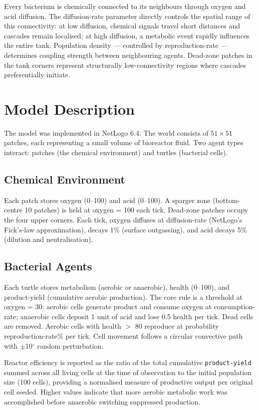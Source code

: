\documentclass[12pt]{article}
\begin{document}
Every bacterium is chemically connected to its neighbours through oxygen and acid diffusion. The diffusion-rate parameter directly controls the spatial range of this connectivity: at low diffusion, chemical signals travel short distances and cascades remain localised; at high diffusion, a metabolic event rapidly influences the entire tank. Population density --- controlled by reproduction-rate --- determines coupling strength between neighbouring agents. Dead-zone patches in the tank corners represent structurally low-connectivity regions where cascades preferentially initiate.

\section{Model Description}

The model was implemented in NetLogo 6.4. The world consists of $51 \times 51$ patches, each representing a small volume of bioreactor fluid. Two agent types interact: patches (the chemical environment) and turtles (bacterial cells).

\subsection{Chemical Environment}

Each patch stores oxygen (0--100) and acid (0--100). A sparger zone (bottom-centre 10 patches) is held at oxygen = 100 each tick. Dead-zone patches occupy the four upper corners. Each tick, oxygen diffuses at diffusion-rate (NetLogo's Fick's-law approximation), decays 1\% (surface outgassing), and acid decays 5\% (dilution and neutralisation).

\subsection{Bacterial Agents}

Each turtle stores metabolism (aerobic or anaerobic), health (0--100), and product-yield (cumulative aerobic production). The core rule is a threshold at oxygen = 30: aerobic cells generate product and consume oxygen at consumption-rate; anaerobic cells deposit 1 unit of acid and lose 0.5 health per tick. Dead cells are removed. Aerobic cells with health $>$ 80 reproduce at probability reproduction-rate\% per tick. Cell movement follows a circular convective path with $\pm$10$^\circ$ random perturbation.

Reactor efficiency is reported as the ratio of the total cumulative 
\texttt{product-yield} summed across all living cells at the time of 
observation to the initial population size (100 cells), providing a 
normalised measure of productive output per original cell seeded. Higher 
values indicate that more aerobic metabolic work was accomplished before 
anaerobic switching suppressed production.
\end{document}
